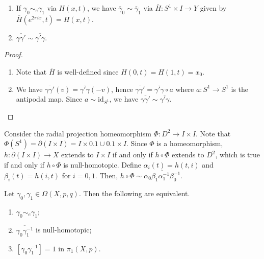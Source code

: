 \begin{lemma}
	\begin{enumerate}
		\item If \( \gamma_0 \sim_e \gamma_1 \) via \( H(x,t) \), we have \( \overline \gamma_0 \sim \overline \gamma_1 \) via \( \overline H \colon S^1 \times I \to Y \) given by \( \overline H(e^{2\pi i x}, t) = H(x,t) \).
		\item \( \overline{\gamma \gamma'} \sim \overline{\gamma'\gamma} \).
	\end{enumerate}
\end{lemma}
\begin{proof}
	\begin{enumerate}
		\item Note that \( \overline H \) is well-defined since \( H(0,t) = H(1,t) = x_0 \).
		\item We have \( \overline{\gamma\gamma'}(v) = \overline{\gamma'\gamma}(-v) \), hence \( \overline{\gamma\gamma'} = \overline{\gamma'\gamma} \circ a \) where \( a \colon S^1 \to S^1 \) is the antipodal map.
			Since \( a \sim \mathrm{id}_{S^1} \), we have \( \overline{\gamma\gamma'} \sim \overline{\gamma'\gamma} \).
	\end{enumerate}
\end{proof}
Consider the radial projection homeomorphism \( \Phi \colon D^2 \to I \times I \).
Note that \( \Phi(S^1) = \partial (I \times I) = I \times \qty{0,1} \cup \qty{0,1} \times I \).
Since \( \Phi \) is a homeomorphism, \( h \colon \partial (I \times I) \to X \) extends to \( I \times I \) if and only if \( h \circ \Phi \) extends to \( D^2 \), which is true if and only if \( h \circ \Phi \) is null-homotopic.
Define \( \alpha_i(t) = h(t,i) \) and \( \beta_i(t) = h(i,t) \) for \( i = 0,1 \).
Then, \( h \circ \Phi \sim \overline{\alpha_0\beta_1\alpha_1^{-1}\beta_0^{-1}} \).
\begin{proposition}
	Let \( \gamma_0, \gamma_1 \in \Omega(X,p,q) \).
	Then the following are equivalent.
	\begin{enumerate}
		\item \( \gamma_0 \sim_e \gamma_1 \);
		\item \( \overline{\gamma_0\gamma_1^{-1}} \) is null-homotopic;
		\item \( [\gamma_0\gamma_1^{-1}] = 1 \) in \( \pi_1(X,p) \).
	\end{enumerate}
\end{proposition}
